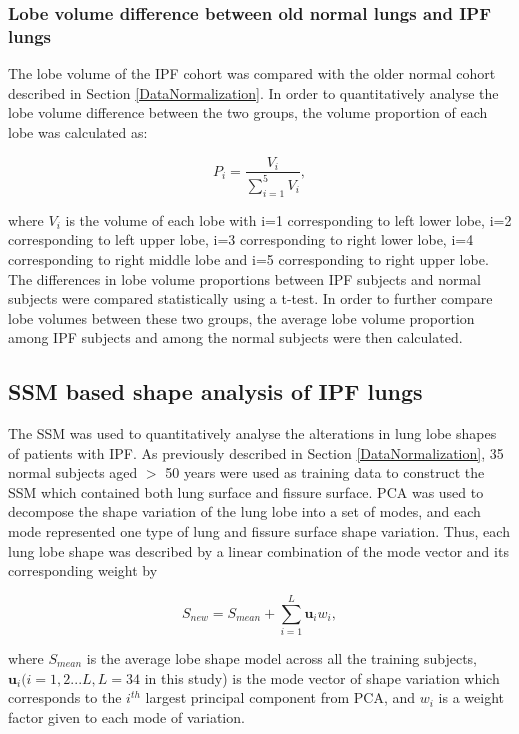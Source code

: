 \subsubsection{Lobe volume difference between old normal lungs and IPF lungs}
The lobe volume of the IPF cohort was compared with the older normal cohort described in Section \ref{DataNormalization}. In order to quantitatively analyse the lobe volume difference between the two groups, the volume proportion of each lobe was calculated as:

\begin{equation}
 \label{eq:FissurePrediction1}
 P_{i} = \frac{V_{i}}{\sum_{i=1}^{5}V_i},
\end{equation}

\noindent where $V_{i}$ is the volume of each lobe with i=1 corresponding to left lower lobe, i=2 corresponding to left upper lobe, i=3 corresponding to right lower lobe, i=4 corresponding to right middle lobe and i=5 corresponding to right upper lobe. The differences in lobe volume proportions between IPF subjects and normal subjects were compared statistically using a t-test. In order to further compare lobe volumes between these two groups, the average lobe volume proportion among IPF subjects and among the normal subjects were then calculated.

\subsection{SSM based shape analysis of IPF lungs} \label{SSMBasedAnalysis}
The SSM was used to quantitatively analyse the alterations in lung lobe shapes of patients with IPF. As previously described in Section \ref{DataNormalization}, 35 normal subjects aged $>$ 50 years were used as training data to construct the SSM which contained both lung surface and fissure surface. PCA was used to decompose the shape variation of the lung lobe into a set of modes, and each mode represented one type of lung and fissure surface shape variation. Thus, each lung lobe shape was described by a linear combination of the mode vector and its corresponding weight by

\begin{equation}
 \label{eq:FissurePrediction1}
 S_{new} = S_{mean} + \sum_{i=1}^L \mathbf{u}_i w_{i},
\end{equation}

\noindent where $S_{mean}$ is the average lobe shape model across all the training subjects, $\mathbf{u}_i (i = 1,2...L, L=34$ in this study) is the mode vector of shape variation which corresponds to the $i^{th}$ largest principal component from PCA, and $w_{i}$ is a weight factor given to each mode of variation. 

